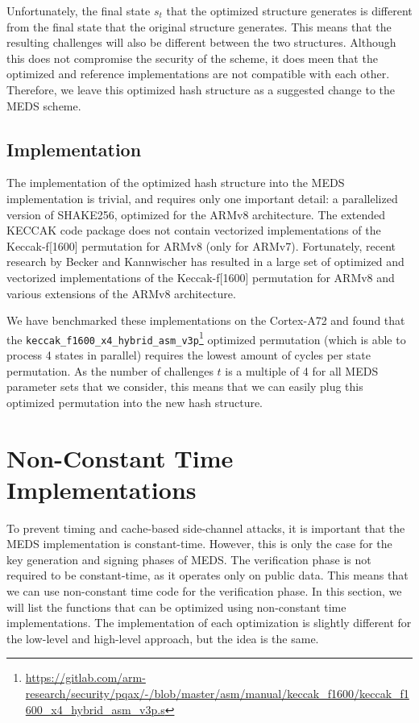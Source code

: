 \documentclass[11pt,a4paper]{report}
\theoremstyle{definition}
\begin{document}
Unfortunately, the final state $s_t$ that the optimized structure generates is different from the final state that the original structure generates. This means that the resulting challenges will also be different between the two structures. Although this does not compromise the security of the scheme, it does meen that the optimized and reference implementations are not compatible with each other. Therefore, we leave this optimized hash structure as a suggested change to the MEDS scheme.

\subsection{Implementation}
The implementation of the optimized hash structure into the MEDS implementation is trivial, and requires only one important detail: a parallelized version of SHAKE256, optimized for the ARMv8 architecture. The extended KECCAK code package \cite{xkcp} does not contain vectorized implementations of the Keccak-f[1600] permutation for ARMv8 (only for ARMv7). Fortunately, recent research by Becker and Kannwischer \cite{becker2022hybrid} has resulted in a large set of optimized and vectorized implementations of the Keccak-f[1600] permutation for ARMv8 and various extensions of the ARMv8 architecture.

We have benchmarked these implementations on the Cortex-A72 and found that the \texttt{keccak\_f1600\_x4\_hybrid\_asm\_v3p}\footnote{\url{https://gitlab.com/arm-research/security/pqax/-/blob/master/asm/manual/keccak\_f1600/keccak\_f1600\_x4\_hybrid\_asm\_v3p.s}} optimized permutation (which is able to process 4 states in parallel) requires the lowest amount of cycles per state permutation. As the number of challenges $t$ is a multiple of 4 for all MEDS parameter sets that we consider, this means that we can easily plug this optimized permutation into the new hash structure.

\section{Non-Constant Time Implementations}
\label{sec:nonconstanttime}
To prevent timing and cache-based side-channel attacks, it is important that the MEDS implementation is constant-time. However, this is only the case for the key generation and signing phases of MEDS. The verification phase is not required to be constant-time, as it operates only on public data. This means that we can use non-constant time code for the verification phase. In this section, we will list the functions that can be optimized using non-constant time implementations. The implementation of each optimization is slightly different for the low-level and high-level approach, but the idea is the same.
\end{document}
